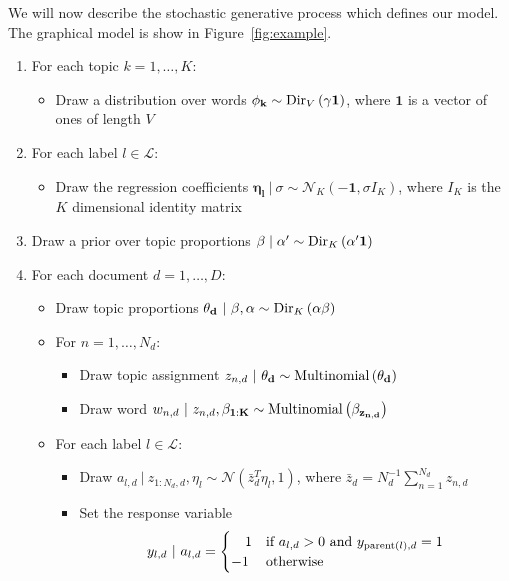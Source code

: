 \documentclass{article}
\begin{document}
We will now describe the stochastic generative process which defines our model.  The graphical model is show in Figure~\ref{fig:example}. 
%
\begin{enumerate}
	\item For each topic $k = 1,\ldots, K$:
	\begin{itemize}
		\item Draw a distribution over words $\mathbf{\phi_{k}}\sim {\rm Dir}_{V}\left(\gamma \mathbf{1}\right)$, where $\mathbf{1}$ is a vector of ones of length $V$
	\end{itemize}
	
	\item For each label $l \in \mathcal{L}$:
	\begin{itemize}
		\item Draw the regression coefficients $\mathbf{\eta_l} \ | \ \sigma \sim \mathcal{N}_{K} \left( -\mathbf{1}, \sigma I_K \right)$, where $I_K$ is the $K$ dimensional identity matrix
	\end{itemize}
	
	\item Draw a prior over topic proportions $\mathbf{\beta}\mid\alpha'\sim {\rm Dir}_{K} \left(\alpha^{\prime} \mathbf{1} \right)$ 

	\item For each document $d = 1, \ldots, D$:
	\begin{itemize} 
		\item Draw topic proportions $\mathbf{\theta_{d}} \ | \ \mathbf{\beta},\alpha \sim {\rm Dir}_{K}\left(\alpha \mathbf{\beta} \right)$ 
		\item For $n = 1, \ldots, N_d$:
		\begin{itemize}
			\item Draw topic assignment $z_{n,d} \ | \ \mathbf{\theta_{d}} \sim {\rm Multinomial} \left(\mathbf{\theta_{d}} \right)$ 
			\item Draw word $w_{n,d} \ | \ z_{n,d},\mathbf{\beta_{1:K}} \sim {\rm Multinomial} \left(\mathbf{\beta_{z_{n,d}}} \right)$ 
		\end{itemize}
		
		\item For each label $l \in \mathcal{L}$:
		\begin{itemize}
			\item Draw $a_{l, d} \ | \ z_{1:N_d,d}, \eta_l \sim \mathcal{N} \left(\bar z_d^{T} \eta_{l},1\right)$, where $\bar z_d=N_d^{-1}\sum_{n=1}^{N_d}z_{n,d}$ 
			\item Set the response variable \begin{equation*} y_{l, d} \ | \ a_{l, d} = \begin{cases}
																										 \ \ \ 1 & \text{if $a_{l,d} > 0$ and $y_{{\rm parent}(l),d} = 1$} \\
																										-1 & \text{otherwise}
																								\end{cases}  
															 \end{equation*}															 
		\end{itemize}
	\end{itemize}
\end{enumerate}
\end{document}
